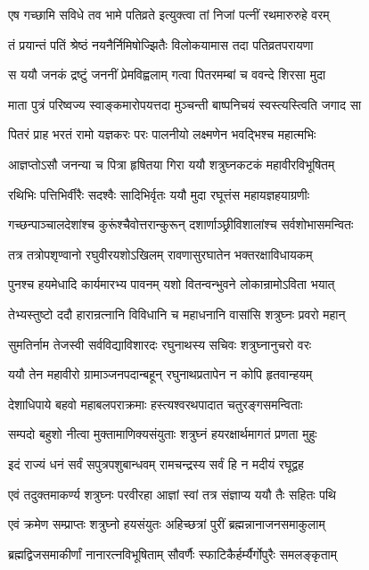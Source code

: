 \twolineshloka
{एष गच्छामि सविधे तव भामे पतिव्रते}
{इत्युक्त्वा तां निजां पत्नीं रथमारुरुहे वरम्}%

\twolineshloka
{तं प्रयान्तं पतिं श्रेष्ठं नयनैर्निमिषोज्झितैः}
{विलोकयामास तदा पतिव्रतपरायणा}%

\twolineshloka
{स ययौ जनकं द्रष्टुं जननीं प्रेमविह्वलाम्}
{गत्वा पितरमम्बां च ववन्दे शिरसा मुदा}%

\twolineshloka
{माता पुत्रं परिष्वज्य स्वाङ्कमारोपयत्तदा}
{मुञ्चन्ती बाष्पनिचयं स्वस्त्यस्त्विति जगाद सा}%

\twolineshloka
{पितरं प्राह भरतं रामो यज्ञकरः परः}
{पालनीयो लक्ष्मणेन भवद्भिश्च महात्मभिः}%

\twolineshloka
{आज्ञप्तोऽसौ जनन्या च पित्रा हृषितया गिरा}
{ययौ शत्रुघ्नकटकं महावीरविभूषितम्}%

\twolineshloka
{रथिभिः पत्तिभिर्वीरैः सदश्वैः सादिभिर्वृतः}
{ययौ मुदा रघूत्तंस महायज्ञहयाग्रणीः}%

\twolineshloka
{गच्छन्पाञ्चालदेशांश्च कुरूंश्चैवोत्तरान्कुरून्}
{दशार्णाञ्छ्रीविशालांश्च सर्वशोभासमन्वितः}%

\twolineshloka
{तत्र तत्रोपशृण्वानो रघुवीरयशोऽखिलम्}
{रावणासुरघातेन भक्तरक्षाविधायकम्}%

\twolineshloka
{पुनश्च हयमेधादि कार्यमारभ्य पावनम्}
{यशो वितन्वन्भुवने लोकान्रामोऽविता भयात्}%

\twolineshloka
{तेभ्यस्तुष्टो ददौ हारान्रत्नानि विविधानि च}
{महाधनानि वासांसि शत्रुघ्नः प्रवरो महान्}%

\twolineshloka
{सुमतिर्नाम तेजस्वी सर्वविद्याविशारदः}
{रघुनाथस्य सचिवः शत्रुघ्नानुचरो वरः}%

\twolineshloka
{ययौ तेन महावीरो ग्रामाञ्जनपदान्बहून्}
{रघुनाथप्रतापेन न कोपि हृतवान्हयम्}%

\twolineshloka
{देशाधिपाये बहवो महाबलपराक्रमाः}
{हस्त्यश्वरथपादात चतुरङ्गसमन्विताः}%

\twolineshloka
{सम्पदो बहुशो नीत्वा मुक्तामाणिक्यसंयुताः}
{शत्रुघ्नं हयरक्षार्थमागतं प्रणता मुहुः}%

\twolineshloka
{इदं राज्यं धनं सर्वं सपुत्रपशुबान्धवम्}
{रामचन्द्रस्य सर्वं हि न मदीयं रघूद्वह}%

\twolineshloka
{एवं तदुक्तमाकर्ण्य शत्रुघ्नः परवीरहा}
{आज्ञां स्वां तत्र संज्ञाप्य ययौ तैः सहितः पथि}%

\twolineshloka
{एवं क्रमेण सम्प्राप्तः शत्रुघ्नो हयसंयुतः}
{अहिच्छत्रां पुरीं ब्रह्मन्नानाजनसमाकुलाम्}%

\twolineshloka
{ब्रह्मद्विजसमाकीर्णां नानारत्नविभूषिताम्}
{सौवर्णैः स्फाटिकैर्हर्म्यैर्गोपुरैः समलङ्कृताम्}%

